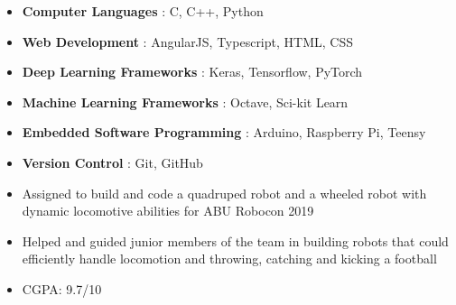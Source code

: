 \documentclass[10pt,a4paper,ragged2e,withhyper]{altacv}
\begin{document}
\begin{paracol}{2}
\begin{itemize}
    \item \textbf{Computer Languages} : C, C++, Python
    \item \textbf{Web Development} : AngularJS, Typescript, HTML, CSS
    \item \textbf{Deep Learning Frameworks} : Keras, Tensorflow, PyTorch
    \item \textbf{Machine Learning Frameworks} : Octave, Sci-kit Learn
    \item \textbf{Embedded Software Programming} : Arduino, Raspberry Pi, Teensy
    \item \textbf{Version Control} : Git, GitHub
\end{itemize}

\begin{itemize}
    \item Assigned to build and code a quadruped robot and a wheeled robot with dynamic locomotive abilities for ABU Robocon 2019
\end{itemize}

\divider

\begin{itemize}
    \item Helped and guided junior members of the team in building robots that could efficiently handle locomotion and throwing, catching and kicking a football
\end{itemize}

\begin{comment}
\cvsection{Strengths}
\cvtag{Deep Learning}
\cvtag{Machine Learning \& Data Science}\\
\cvtag{Software Development}
\cvtag{Researcher}
\cvtag{Hardworking}\\
\cvtag{Adaptable}
\cvtag{Communication skills}
\end{comment}
\switchcolumn

\begin{itemize}
    \item CGPA: 9.7/10
\end{itemize}


\end{paracol}
\end{document}
